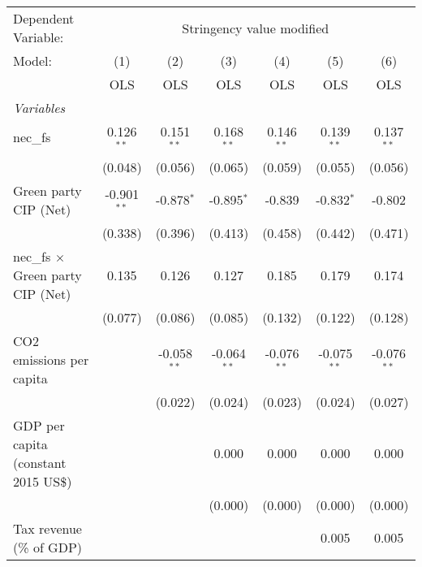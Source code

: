
\begingroup
\centering
\begin{tabular}{lcccccc}
   \toprule
   Dependent Variable: & \multicolumn{6}{c}{Stringency value modified}\\
   Model:                                   & (1)           & (2)           & (3)           & (4)           & (5)           & (6)\\  
                                            &  OLS          & OLS           & OLS           & OLS           & OLS           & OLS\\  
   \midrule
   \emph{Variables}\\
   nec\_fs                                  & 0.126$^{**}$  & 0.151$^{**}$  & 0.168$^{**}$  & 0.146$^{**}$  & 0.139$^{**}$  & 0.137$^{**}$\\   
                                            & (0.048)       & (0.056)       & (0.065)       & (0.059)       & (0.055)       & (0.056)\\   
   Green party CIP (Net)                    & -0.901$^{**}$ & -0.878$^{*}$  & -0.895$^{*}$  & -0.839        & -0.832$^{*}$  & -0.802\\   
                                            & (0.338)       & (0.396)       & (0.413)       & (0.458)       & (0.442)       & (0.471)\\   
   nec\_fs $\times$ Green party CIP (Net)   & 0.135         & 0.126         & 0.127         & 0.185         & 0.179         & 0.174\\   
                                            & (0.077)       & (0.086)       & (0.085)       & (0.132)       & (0.122)       & (0.128)\\   
   CO2 emissions per capita                 &               & -0.058$^{**}$ & -0.064$^{**}$ & -0.076$^{**}$ & -0.075$^{**}$ & -0.076$^{**}$\\   
                                            &               & (0.022)       & (0.024)       & (0.023)       & (0.024)       & (0.027)\\   
   GDP per capita (constant 2015 US\$)      &               &               & 0.000         & 0.000         & 0.000         & 0.000\\   
                                            &               &               & (0.000)       & (0.000)       & (0.000)       & (0.000)\\   
   Tax revenue (\% of GDP)                  &               &               &               &               & 0.005         & 0.005\\   

\end{tabular}

